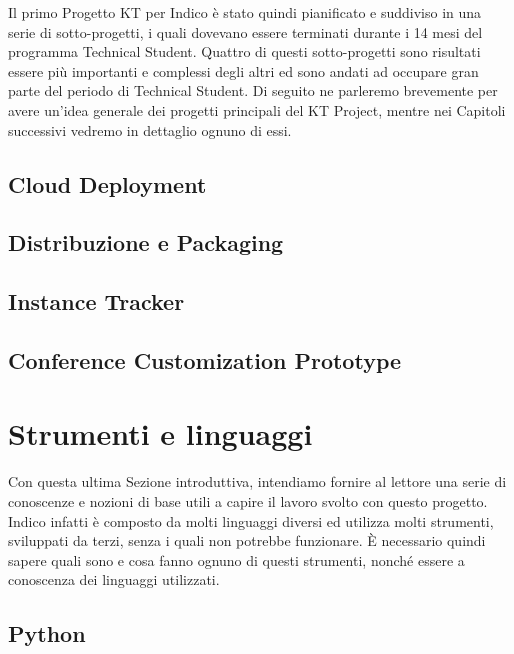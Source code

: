     	Il primo Progetto KT per Indico è stato quindi pianificato e suddiviso in una serie di sotto-progetti, i quali dovevano essere terminati durante i 14 mesi del programma Technical Student. Quattro di questi sotto-progetti sono risultati essere più importanti e complessi degli altri ed sono andati ad occupare gran parte del periodo di Technical Student. Di seguito ne parleremo brevemente per avere un'idea generale dei progetti principali del KT Project, mentre nei Capitoli successivi vedremo in dettaglio ognuno di essi.
    	
    	\subsection{Cloud Deployment} \label{subsec:p;pp;cloud}
    	
    	\subsection{Distribuzione e Packaging} \label{subsec:p;pp:distribuzione}
    	
    	\subsection{Instance Tracker} \label{subsec:p;pp;instance_tracker}
    	
    	\subsection{Conference Customization Prototype} \label{subsec:p;pp;conference_customization_prototype}
    	
    \section{Strumenti e linguaggi} \label{sec:p;strumenti_linguaggi}
    
        Con questa ultima Sezione introduttiva, intendiamo fornire al lettore una serie di conoscenze e nozioni di base utili a capire il lavoro svolto con questo progetto. Indico infatti è composto da molti linguaggi diversi ed utilizza molti strumenti, sviluppati da terzi, senza i quali non potrebbe funzionare. È necessario quindi sapere quali sono e cosa fanno ognuno di questi strumenti, nonché essere a conoscenza dei linguaggi utilizzati.
    
        \subsection{Python} \label{subsec:p;sl;python}
        
